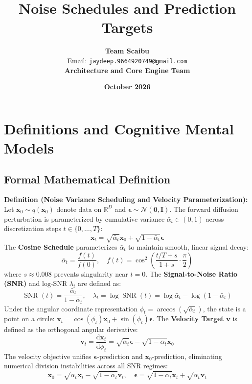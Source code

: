 \documentclass[11pt,a4paper]{article}
\title{\textbf{Noise Schedules and Prediction Targets}}
\author{\textbf{Team Scaibu} \\ \small Email: \texttt{jaydeep.9664920749@gmail.com} \\ \small \textbf{Architecture and Core Engine Team}}
\date{\textbf{October 2026}}
\theoremstyle{definition}
\begin{document}
\maketitle

\section{Definitions and Cognitive Mental Models}

\subsection{Formal Mathematical Definition}
\textbf{Definition (Noise Variance Scheduling and Velocity Parameterization):}
Let $\mathbf{x}_0 \sim q(\mathbf{x}_0)$ denote data on $\mathbb{R}^D$ and $\boldsymbol{\epsilon} \sim \mathcal{N}(\mathbf{0}, \mathbf{I})$. The forward diffusion perturbation is parameterized by cumulative variance $\bar{\alpha}_t \in (0, 1)$ across discretization steps $t \in \{0, \dots, T\}$:
{\boldmath
\begin{equation}
\mathbf{x}_t = \sqrt{\bar{\alpha}_t} \mathbf{x}_0 + \sqrt{1 - \bar{\alpha}_t} \boldsymbol{\epsilon}
\end{equation}
}
The \textbf{Cosine Schedule} parameterizes $\bar{\alpha}_t$ to maintain smooth, linear signal decay:
{\boldmath
\begin{equation}
\bar{\alpha}_t = \frac{f(t)}{f(0)}, \quad f(t) = \cos^2\left( \frac{t/T + s}{1 + s} \cdot \frac{\pi}{2} \right)
\end{equation}
}
where $s \approx 0.008$ prevents singularity near $t = 0$. The \textbf{Signal-to-Noise Ratio (SNR)} and log-SNR $\lambda_t$ are defined as:
{\boldmath
\begin{equation}
\operatorname{SNR}(t) = \frac{\bar{\alpha}_t}{1 - \bar{\alpha}_t}, \quad \lambda_t = \log \operatorname{SNR}(t) = \log \bar{\alpha}_t - \log(1 - \bar{\alpha}_t)
\end{equation}
}
Under the angular coordinate representation $\phi_t = \arccos(\sqrt{\bar{\alpha}_t})$, the state is a point on a circle: $\mathbf{x}_t = \cos(\phi_t)\mathbf{x}_0 + \sin(\phi_t)\boldsymbol{\epsilon}$. The \textbf{Velocity Target} $\mathbf{v}$ is defined as the orthogonal angular derivative:
{\boldmath
\begin{equation}
\mathbf{v}_t = \frac{\mathrm{d}\mathbf{x}_t}{\mathrm{d}\phi_t} = \sqrt{\bar{\alpha}_t}\boldsymbol{\epsilon} - \sqrt{1 - \bar{\alpha}_t}\mathbf{x}_0
\end{equation}
}
The velocity objective unifies $\boldsymbol{\epsilon}$-prediction and $\mathbf{x}_0$-prediction, eliminating numerical division instabilities across all SNR regimes:
{\boldmath
\begin{equation}
\mathbf{x}_0 = \sqrt{\bar{\alpha}_t}\mathbf{x}_t - \sqrt{1 - \bar{\alpha}_t}\mathbf{v}_t, \quad \boldsymbol{\epsilon} = \sqrt{1 - \bar{\alpha}_t}\mathbf{x}_t + \sqrt{\bar{\alpha}_t}\mathbf{v}_t
\end{equation}
}
\end{document}
